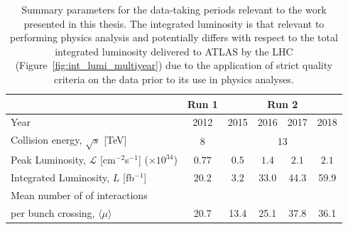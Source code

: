 \begin{table}[!htb]
    \begin{center}
        \begin{tabular}{l | c | c c c c }
        \hline
        \hline
        & \textbf{Run 1} & \multicolumn{4}{c}{\textbf{Run 2}} \\
        \hline
        Year & 2012 & 2015 & 2016 & 2017 & 2018 \\
        \hline
        Collision energy, $\sqrt{s}$ [TeV] & 8 & \multicolumn{4}{c}{13} \\
        Peak Luminosity, $\mathcal{L}$ [cm$^{-2}$s$^{-1}$] ($\times10^{34}$) & $0.77$ & $0.5$ & $1.4$ & $2.1$ & $2.1$ \\ 
        Integrated Luminosity, $L$ [fb$^{-1}$] & 20.2 & 3.2 & 33.0 & 44.3 & 59.9 \\
        Mean number of of interactions & & & & & \\
        \hspace{1.7cm} per bunch crossing, $\langle \mu \rangle$ & 20.7 & 13.4 & 25.1 & 37.8 & 36.1 \\
        \hline
        \hline
        \end{tabular}
        \caption{
            Summary parameters for the data-taking periods relevant to the work
            presented in this thesis. The integrated luminosity is that relevant
            to performing physics analysis and potentially differs with respect to
            the total integrated luminosity delivered to ATLAS by the LHC (Figure~\ref{fig:int_lumi_multiyear}) due to
            the application of strict quality criteria on the data prior to its use
            in physics analyses.
        }
        \label{tab:lumi_tab}
    \end{center}
\end{table}

